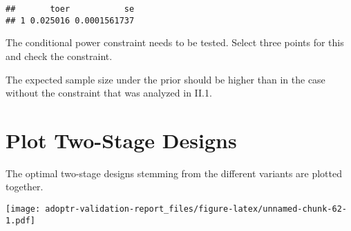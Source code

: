 \documentclass[]{book}
\newenvironment{Shaded}{\begin{snugshade}}{\end{snugshade}}
\newcommand{\ControlFlowTok}[1]{\textcolor[rgb]{0.13,0.29,0.53}{\textbf{#1}}}
\newcommand{\DecValTok}[1]{\textcolor[rgb]{0.00,0.00,0.81}{#1}}
\newcommand{\FloatTok}[1]{\textcolor[rgb]{0.00,0.00,0.81}{#1}}
\newcommand{\KeywordTok}[1]{\textcolor[rgb]{0.13,0.29,0.53}{\textbf{#1}}}
\newcommand{\NormalTok}[1]{#1}
\newcommand{\OperatorTok}[1]{\textcolor[rgb]{0.81,0.36,0.00}{\textbf{#1}}}
\newcommand{\StringTok}[1]{\textcolor[rgb]{0.31,0.60,0.02}{#1}}
\begin{document}
\begin{verbatim}
##       toer           se
## 1 0.025016 0.0001561737
\end{verbatim}

The conditional power constraint needs to be tested.
Select three points for this and check the constraint.

\begin{Shaded}
\end{Shaded}

The expected sample size under the prior should be higher than
in the case without the constraint that was analyzed in II.1.

\begin{Shaded}
\end{Shaded}

\hypertarget{plot-two-stage-designs-1}{%
\section{Plot Two-Stage Designs}\label{plot-two-stage-designs-1}}

The optimal two-stage designs stemming from the different variants
are plotted together.

\texttt{[image: adoptr-validation-report\_files/figure-latex/unnamed-chunk-62-1.pdf]}
\end{document}
